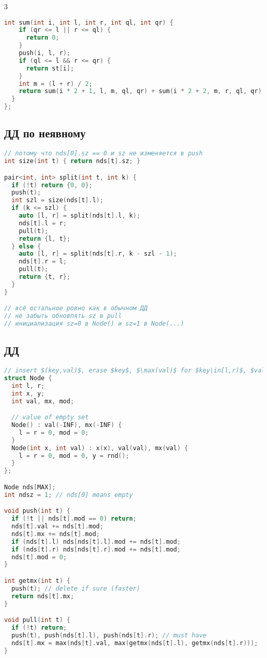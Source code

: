 \documentclass[9pt,a4paper,landscape,twosided]{extarticle}
\begin{document}
\begin{multicols*}{3}
\begin{lstlisting}[language=C++]
  int sum(int i, int l, int r, int ql, int qr) {
    if (qr <= l || r <= ql) {
      return 0;
    }
    push(i, l, r);
    if (ql <= l && r <= qr) {
      return st[i];
    }
    int m = (l + r) / 2;
    return sum(i * 2 + 1, l, m, ql, qr) + sum(i * 2 + 2, m, r, ql, qr);
  }
};
\end{lstlisting}

\subsection{ДД по неявному}
\begin{lstlisting}[language=C++]
// потому что nds[0].sz == 0 и sz не изменяется в push
int size(int t) { return nds[t].sz; }

pair<int, int> split(int t, int k) {
  if (!t) return {0, 0};
  push(t);
  int szl = size(nds[t].l);
  if (k <= szl) {
    auto [l, r] = split(nds[t].l, k);
    nds[t].l = r;
    pull(t);
    return {l, t};
  } else {
    auto [l, r] = split(nds[t].r, k - szl - 1);
    nds[t].r = l;
    pull(t);
    return {t, r};
  }
}

// всё остальное ровно как в обычном ДД
// не забыть обновлять sz в pull 
// инициализация sz=0 в Node() и sz=1 в Node(...)


\end{lstlisting}

\subsection{ДД}
\begin{lstlisting}[language=C++]
// insert $(key,val)$, erase $key$, $\max(val)$ for $key\in[l,r)$, $val$+= for $key\in[l,r)$
struct Node {
  int l, r;
  int x, y;
  int val, mx, mod;

  // value of empty set
  Node() : val(-INF), mx(-INF) {
    l = r = 0, mod = 0;
  }
  Node(int x, int val) : x(x), val(val), mx(val) {
    l = r = 0, mod = 0, y = rnd();
  }
};

Node nds[MAX];
int ndsz = 1; // nds[0] means empty

void push(int t) {
  if (!t || nds[t].mod == 0) return;
  nds[t].val += nds[t].mod;
  nds[t].mx += nds[t].mod;
  if (nds[t].l) nds[nds[t].l].mod += nds[t].mod;
  if (nds[t].r) nds[nds[t].r].mod += nds[t].mod;
  nds[t].mod = 0;
}

int getmx(int t) {
  push(t); // delete if sure (faster)
  return nds[t].mx;
}

void pull(int t) {
  if (!t) return;
  push(t), push(nds[t].l), push(nds[t].r); // must have
  nds[t].mx = max(nds[t].val, max(getmx(nds[t].l), getmx(nds[t].r)));
}


\end{lstlisting}
\end{multicols*}
\end{document}
